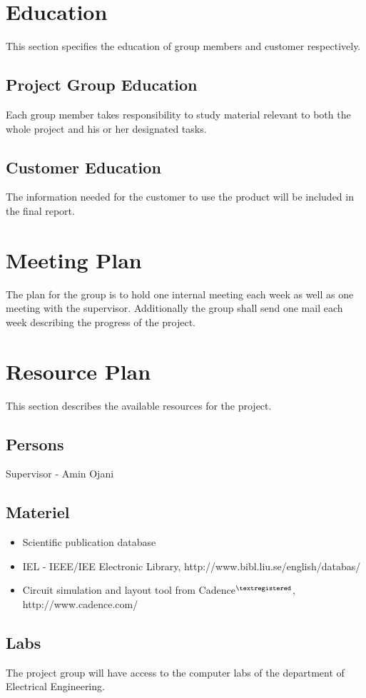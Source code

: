 \documentclass[a4paper,12pt]{article} \usepackage{graphicx}
\begin{document}
\section{Education}
This section specifies the education of group members and customer respectively.
\subsection{Project Group Education}
Each group member takes responsibility to study material relevant to both the
whole project and his or her designated tasks. 

\subsection{Customer Education}
The information needed for the customer to use the product will be included in
the final report.

\section{Meeting Plan}
The plan for the group is to hold one internal meeting each week as well as one meeting with the supervisor.
Additionally the group shall send one mail each week describing the progress of the project.

\section{Resource Plan} 
This section describes the available resources for the project.
\subsection{Persons} 
Supervisor - Amin Ojani
\subsection{Materiel}
\begin{itemize}
        \item{Scientific publication database}
        \item{IEL - IEEE/IEE Electronic Library, http://www.bibl.liu.se/english/databas/}
        \item{Circuit simulation and layout tool from Cadence$^{\textregistered}$, http://www.cadence.com/}
\end{itemize}

\subsection{Labs}
The project group will have access to the computer 
labs of the department of Electrical Engineering.
\end{document}
